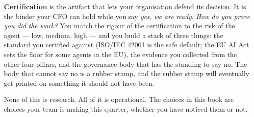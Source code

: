 \textbf{Certification} is the artifact that lets your organisation defend its decision. It is the binder your CFO can hold while you say \textit{yes, we are ready}. \textit{How do you prove you did the work?} You match the rigour of the certification to the risk of the agent --- low, medium, high --- and you build a stack of three things: the standard you certified against (ISO/IEC 42001 is the safe default; the EU AI Act sets the floor for some agents in the EU), the evidence you collected from the other four pillars, and the governance body that has the standing to say no. The body that cannot say no is a rubber stamp, and the rubber stamp will eventually get printed on something it should not have been.

None of this is research. All of it is operational. The choices in this book are choices your team is making this quarter, whether you have noticed them or not.

\stoptwocol
